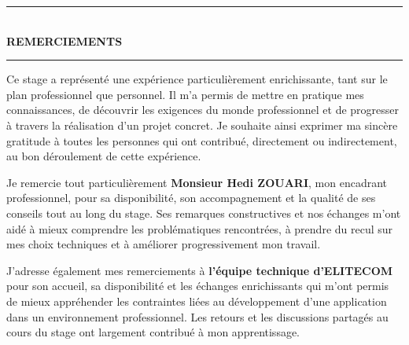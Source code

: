\documentclass[12pt,a4paper]{extreport}
\begin{document}

\begin{titlepage}
\thispagestyle{empty}
\vspace*{1.2cm}

\begin{center}
{\color{black}\rule{0.22\textwidth}{1.2pt}}\\[0.45cm]
{\Huge\bfseries\color{black} REMERCIEMENTS}\\[0.45cm]
{\color{black}\rule{0.22\textwidth}{1.2pt}}
\end{center}

\vspace{0.9cm}

\begin{center}
\begin{minipage}{0.88\textwidth}

\noindent Ce stage a représenté une expérience particulièrement enrichissante, tant sur le plan professionnel que personnel. Il m'a permis de mettre en pratique mes connaissances, de découvrir les exigences du monde professionnel et de progresser à travers la réalisation d'un projet concret. Je souhaite ainsi exprimer ma sincère gratitude à toutes les personnes qui ont contribué, directement ou indirectement, au bon déroulement de cette expérience.

\vspace{0.3cm}

\noindent Je remercie tout particulièrement \textbf{Monsieur Hedi ZOUARI}, mon encadrant professionnel, pour sa disponibilité, son accompagnement et la qualité de ses conseils tout au long du stage. Ses remarques constructives et nos échanges m'ont aidé à mieux comprendre les problématiques rencontrées, à prendre du recul sur mes choix techniques et à améliorer progressivement mon travail.

\vspace{0.3cm}

\noindent J'adresse également mes remerciements à \textbf{l'équipe technique d'\mbox{ELITECOM}} pour son accueil, sa disponibilité et les échanges enrichissants qui m'ont permis de mieux appréhender les contraintes liées au développement d'une application dans un environnement professionnel. Les retours et les discussions partagés au cours du stage ont largement contribué à mon apprentissage.


\end{minipage}
\end{center}
\end{titlepage}
\end{document}
